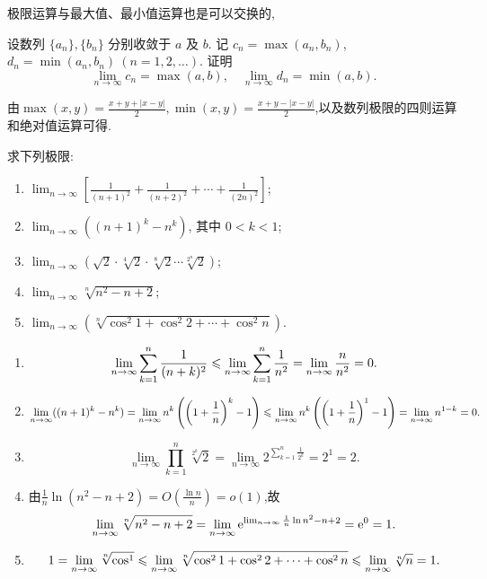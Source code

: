 极限运算与最大值、最小值运算也是可以交换的,

\begin{exercise}[1.2.14]
    设数列 $\{a_n\}, \{b_n\}$ 分别收敛于 $a$ 及 $b$. 记 $c_n = \max(a_n, b_n)$, $d_n = \min(a_n, b_n) \ (n=1, 2, \ldots)$. 证明
    $$
        \lim_{n\to\infty} c_n = \max(a, b), \quad \lim_{n\to\infty} d_n = \min(a, b).
    $$
\end{exercise}

\begin{solution}
    由$\max(x,y) = \frac{x+y+|x-y|}{2}, \min(x,y) = \frac{x+y-|x-y|}{2}$,以及数列极限的四则运算和绝对值运算可得.
\end{solution}

\begin{exercise}[1.2.15]
    求下列极限:
    \begin{enumerate}[(1)]
        \item $\lim_{n\to\infty} \left[\frac{1}{(n+1)^2} + \frac{1}{(n+2)^2} + \cdots + \frac{1}{(2n)^2}\right]$;
        \item $\lim_{n\to\infty} ((n+1)^k - n^k)$, 其中 $0 < k < 1$;
        \item $\lim_{n\to\infty} (\sqrt{2} \cdot \sqrt[4]{2} \cdot \sqrt[8]{2} \cdots \sqrt[2^n]{2})$;
        \item $\lim_{n\to\infty} \sqrt[n]{n^2 - n + 2}$;
        \item $\lim_{n\to\infty} \left(\sqrt[n]{\cos^2 1 + \cos^2 2 + \cdots + \cos^2 n}\right)$.
    \end{enumerate}
\end{exercise}

\begin{solution}
    \begin{enumerate}[(1)]
        \item $$\lim_{n\to\infty} \sum_{k=1}^{n} \frac{1}{(n+k)^2} \leqslant \lim_{n\to\infty} \sum_{k=1}^{n} \frac{1}{n^2} = \lim_{n\to\infty} \frac{n}{n^2} = 0.$$
        \item $$\lim_{n\to\infty} ((n+1)^k - n^k) = \lim_{n\to\infty} n^k \left( \left( 1 + \frac{1}{n} \right)^k - 1 \right) \leqslant \lim_{n\to\infty} n^k \left( \left( 1 + \frac{1}{n} \right)^1 - 1 \right)  = \lim_{n\to\infty} n^{1-k} = 0.$$
        \item $$\lim_{n\to\infty} \prod_{k=1}^{n} \sqrt[2^k]{2} = \lim_{n\to\infty} 2^{\sum_{k=1}^{n} \frac{1}{2^k}} = 2^1 = 2.$$
        \item 由$\frac{1}{n} \ln(n^2 - n + 2) = O\left( \frac{\ln n}{n} \right) = o(1)$,故
              $$\lim_{n\to\infty} \sqrt[n]{n^2 - n + 2} = \lim_{n\to\infty} \mathrm{e}^{\lim_{n\to\infty} \frac{1}{n} \ln n^2 - n + 2} = \mathrm{e}^0 = 1.$$
        \item $$1 = \lim_{n\to\infty} \sqrt[n]{\cos^1} \leqslant \lim_{n\to\infty} \sqrt[n]{\cos^2 1 + \cos^2 2 + \cdots + \cos^2 n} \leqslant \lim_{n\to\infty} \sqrt[n]{n} = 1.$$
    \end{enumerate}
\end{solution}

